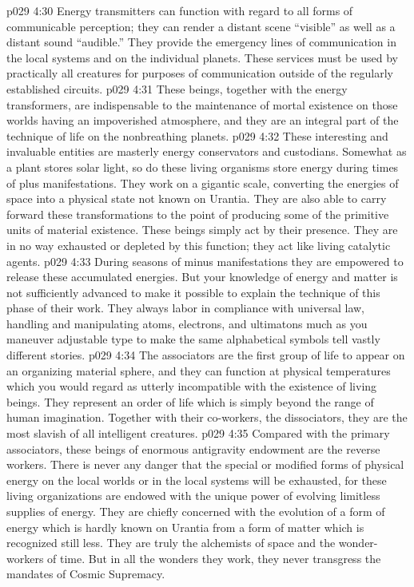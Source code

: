 \vs p029 4:30 Energy transmitters can function with regard to all forms of communicable perception; they can render a distant scene “visible” as well as a distant sound “audible.” They provide the emergency lines of communication in the local systems and on the individual planets. These services must be used by practically all creatures for purposes of communication outside of the regularly established circuits.
\vs p029 4:31 These beings, together with the energy transformers, are indispensable to the maintenance of mortal existence on those worlds having an impoverished atmosphere, and they are an integral part of the technique of life on the nonbreathing planets.
\pc \vs p029 4:32 \bibnobreakspace {} These interesting and invaluable entities are masterly energy conservators and custodians. Somewhat as a plant stores solar light, so do these living organisms store energy during times of plus manifestations. They work on a gigantic scale, converting the energies of space into a physical state not known on Urantia. They are also able to carry forward these transformations to the point of producing some of the primitive units of material existence. These beings simply act by their presence. They are in no way exhausted or depleted by this function; they act like living catalytic agents.
\vs p029 4:33 During seasons of minus manifestations they are empowered to release these accumulated energies. But your knowledge of energy and matter is not sufficiently advanced to make it possible to explain the technique of this phase of their work. They always labor in compliance with universal law, handling and manipulating atoms, electrons, and ultimatons much as you maneuver adjustable type to make the same alphabetical symbols tell vastly different stories.
\vs p029 4:34 The associators are the first group of life to appear on an organizing material sphere, and they can function at physical temperatures which you would regard as utterly incompatible with the existence of living beings. They represent an order of life which is simply beyond the range of human imagination. Together with their co\hyp{}workers, the dissociators, they are the most slavish of all intelligent creatures.
\vs p029 4:35 \bibnobreakspace {} Compared with the primary associators, these beings of enormous antigravity endowment are the reverse workers. There is never any danger that the special or modified forms of physical energy on the local worlds or in the local systems will be exhausted, for these living organizations are endowed with the unique power of evolving limitless supplies of energy. They are chiefly concerned with the evolution of a form of energy which is hardly known on Urantia from a form of matter which is recognized still less. They are truly the alchemists of space and the wonder\hyp{}workers of time. But in all the wonders they work, they never transgress the mandates of Cosmic Supremacy.
